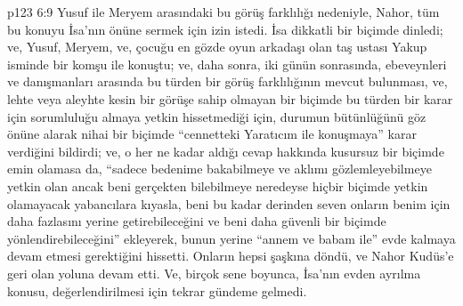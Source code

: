 \vs p123 6:9 Yusuf ile Meryem arasındaki bu görüş farklılığı nedeniyle, Nahor, tüm bu konuyu İsa’nın önüne sermek için izin istedi. İsa dikkatli bir biçimde dinledi; ve, Yusuf, Meryem, ve, çocuğu en gözde oyun arkadaşı olan taş ustası Yakup isminde bir komşu ile konuştu; ve, daha sonra, iki günün sonrasında, ebeveynleri ve danışmanları arasında bu türden bir görüş farklılığının mevcut bulunması, ve, lehte veya aleyhte kesin bir görüşe sahip olmayan bir biçimde bu türden bir karar için sorumluluğu almaya yetkin hissetmediği için, durumun bütünlüğünü göz önüne alarak nihai bir biçimde “cennetteki Yaratıcım ile konuşmaya” karar verdiğini bildirdi; ve, o her ne kadar aldığı cevap hakkında kusursuz bir biçimde emin olamasa da, “sadece bedenime bakabilmeye ve aklımı gözlemleyebilmeye yetkin olan ancak beni gerçekten bilebilmeye neredeyse hiçbir biçimde yetkin olamayacak yabancılara kıyasla, beni bu kadar derinden seven onların benim için daha fazlasını yerine getirebileceğini ve beni daha güvenli bir biçimde yönlendirebileceğini” ekleyerek, bunun yerine “annem ve babam ile” evde kalmaya devam etmesi gerektiğini hissetti. Onların hepsi şaşkına döndü, ve Nahor Kudüs’e geri olan yoluna devam etti. Ve, birçok sene boyunca, İsa’nın evden ayrılma konusu, değerlendirilmesi için tekrar gündeme gelmedi.
